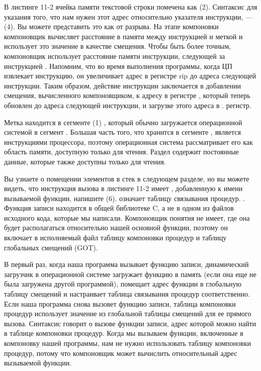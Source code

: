В листинге 11-2 ячейка памяти текстовой строки помечена как  (2). Синтаксис для указания того, что нам нужен этот адрес относительно указателя инструкции, —  (4). Вы можете представить это как  от разрыва. На этапе компоновки компоновщик вычисляет расстояние в памяти между инструкцией  и меткой  и использует это значение в качестве смещения. Чтобы быть более точным, компоновщик использует расстояние памяти инструкции, следующей за инструкцией . Напомним, что во время выполнения программы, когда ЦП извлекает инструкцию, он увеличивает адрес в регистре rip до адреса следующей инструкции. Таким образом, действие инструкции  заключается в добавлении смещения, вычисленного компоновщиком, к адресу в регистре , который теперь обновлен до адреса следующей инструкции, и загрузке этого адреса в . регистр.

Метка  находится в сегменте (1) , который обычно загружается операционной системой в сегмент . Большая часть того, что хранится в сегменте , является инструкциями процессора, поэтому операционная система рассматривает его как область памяти, доступную только для чтения. Раздел  содержит постоянные данные, которые также доступны только для чтения.

Вы узнаете о помещении элементов в стек в следующем разделе, но вы можете видеть, что инструкция вызова в листинге 11-2 имеет , добавленную к имени вызываемой функции, напишите (6).  означает таблицу связывания процедур. . Функция записи находится в общей библиотеке C, а не в одном из файлов исходного кода, которые мы написали. Компоновщик понятия не имеет, где она будет располагаться относительно нашей основной функции, поэтому он включает в исполняемый файл таблицу компоновки процедур и таблицу глобальных смещений (GOT).

В первый раз, когда наша программа вызывает функцию записи, динамический загрузчик в операционной системе загружает функцию в память (если она еще не была загружена другой программой), помещает адрес функции в глобальную таблицу смещений и настраивает таблица связывания процедур соответственно. Если наша программа снова вызовет функцию записи, таблица компоновки процедур использует значение из глобальной таблицы смещений для ее прямого вызова. Синтаксис  говорит о вызове функции записи, адрес которой можно найти в таблице компоновки процедур. Когда мы вызываем функции, включенные в компоновку нашей программы, нам не нужно использовать таблицу компоновки процедур, потому что компоновщик может вычислить относительный адрес вызываемой функции.

